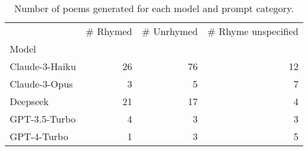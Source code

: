 \begin{table}[H]
  \centering
  \small
  \singlespacing
  \begin{tabular}{lrrr}
  \toprule
   & \# Rhymed & \# Unrhymed & \# Rhyme unspecified \\
  Model &  &  &  \\
  \midrule
  Claude-3-Haiku & 26 & 76 & 12 \\
  Claude-3-Opus & 3 & 5 & 7 \\
  Deepseek & 21 & 17 & 4 \\
  GPT-3.5-Turbo & 4 & 3 & 3 \\
  GPT-4-Turbo & 1 & 3 & 5 \\
  \bottomrule
  \end{tabular}
  \caption{Number of poems generated for each model and prompt category.}
  \label{tab:num_poems_models}
\end{table}